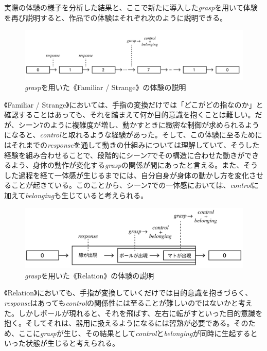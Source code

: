 実際の体験の様子を分析した結果と、ここで新たに導入した\textit{grasp}を用いて体験を再び説明すると、作品での体験はそれぞれ次のように説明できる。

\begin{figure}[H]
  \centering
  \includegraphics[width=15cm]{img/result_fs.png}
  \caption{\textit{grasp}を用いた《Familiar / Strange》の体験の説明}
  \label{fig:result_fs}
\end{figure}

《Familiar / Strange》においては、手指の変換だけでは「どこがどの指なのか」と確認することはあっても、それを踏まえて何か目的意識を抱くことは難しい。だが、シーン7のように複雑度が増し、動かすときに緻密な制御が求められるようになると、\textit{control}と取れるような経験があった。そして、この体験に至るためにはそれまでの\textit{response}を通して動きの仕組みについては理解していて、そうした経験を組み合わせることで、段階的にシーン7でその構造に合わせた動きができるよう、身体の動作が変化する\textit{grasp}の関係が間にあったと言える。また、そうした過程を経て一体感が生じるまでには、自分自身が身体の動かし方を変化させることが起きている。このことから、シーン7での一体感においては、\textit{control}に加えて\textit{belonging}も生じていると考えられる。

\begin{figure}[H]
  \centering
  \includegraphics[width=15cm]{img/result_rl.png}
  \caption{\textit{grasp}を用いた《Relation》の体験の説明}
  \label{fig:result_rl}
\end{figure}

《Relation》においても、手指が変換していくだけでは目的意識を抱きづらく、\textit{response}はあっても\textit{control}の関係性には至ることが難しいのではないかと考えた。しかしボールが現れると、それを飛ばす、左右に転がすといった目的意識を抱く。そしてそれは、器用に扱えるようになるには習熟が必要である。そのため、ここに\textit{grasp}が生じ、その結果として\textit{control}と\textit{belonging}が同時に生起するといった状態が生じると考えられる。

